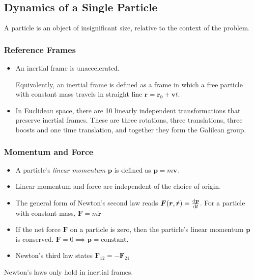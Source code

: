 \documentclass[11pt, a4paper]{article}
\begin{document}
\subsection{Dynamics of a Single Particle}
A particle is an object of insignificant size, relative to the context of the problem. 

\subsubsection{Reference Frames}
\begin{itemize}
	\item An inertial frame is unaccelerated. 
	
	Equivalently, an inertial frame is defined as a frame in which a free particle with constant mass travels in straight line $ \bm{r} = \bm{r}_0 + \bm{v}t $.
	
	\item In Euclidean space, there are 10 linearly independent transformations that preserve inertial frames. These are three rotations, three translations, three boosts and one time translation, and together they form the Galilean group.
\end{itemize}


\subsubsection{Momentum and Force}

\begin{itemize}
	\item A particle's \textit{linear momentum} $ \bm{p} $ is defined as $ \bm{p} = m \bm{v} $.
	
	\item Linear momentum and force are independent of the choice of origin.
	
	\item The general form of Newton's second law reads $ \bm{F}(\bm{r}, \dot{\bm{r}}) = \dv{\bm{p}}{t} $. For a particle with constant mass, $ \bm{F} = m \ddot{\bm{r}} $

	\item If the net force $ \bm{F} $ on a particle is zero, then the particle's linear momentum $ \bm{p} $ is conserved. $ \bm{F} = 0 \implies \bm{p} = \text{constant} $.

	\item Newton's third law states $ \bm{F}_{12} = - \bm{F}_{21} $
\end{itemize}
Newton's laws only hold in inertial frames. 
\end{document}

